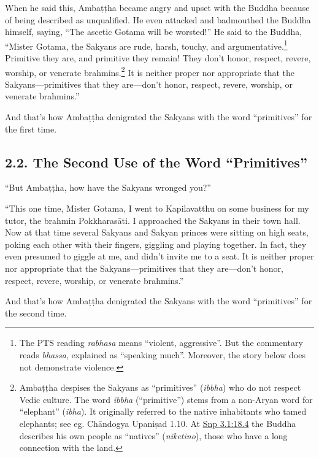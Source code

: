 \documentclass[12pt,openany]{book}%
\begin{document}
When he said this, \textsanskrit{Ambaṭṭha} became angry and upset with the Buddha because of being described as unqualified. He even attacked and badmouthed the Buddha himself, saying, “The ascetic Gotama will be worsted!” He said to the Buddha, “Mister Gotama, the Sakyans are rude, harsh, touchy, and argumentative.\footnote{The PTS reading \textit{rabhasa} means “violent, aggressive”. But the commentary reads \textit{bhassa}, explained as “speaking much”. Moreover, the story below does not demonstrate violence. } Primitive they are, and primitive they remain! They don’t honor, respect, revere, worship, or venerate brahmins.\footnote{\textsanskrit{Ambaṭṭha} despises the Sakyans as “primitives” (\textit{ibbha}) who do not respect Vedic culture. The word \textit{ibbha} (“primitive”) stems from a non-Aryan word for “elephant” (\textit{ibha}). It originally referred to the native inhabitants who tamed elephants; see eg. \textsanskrit{Chāndogya} \textsanskrit{Upaniṣad} 1.10. At \href{https://suttacentral.net/snp3.1/en/sujato\#18.4}{Snp 3.1:18.4} the Buddha describes his own people as “natives” (\textit{niketino}), those who have a long connection with the land. } It is neither proper nor appropriate that the Sakyans—primitives that they are—don’t honor, respect, revere, worship, or venerate brahmins.” 

And that’s how \textsanskrit{Ambaṭṭha} denigrated the Sakyans with the word “primitives” for the first time. 

\subsection*{2.2. The Second Use of the Word “Primitives” }

“But \textsanskrit{Ambaṭṭha}, how have the Sakyans wronged you?” 

“This one time, Mister Gotama, I went to Kapilavatthu on some business for my tutor, the brahmin \textsanskrit{Pokkharasāti}. I approached the Sakyans in their town hall. Now at that time several Sakyans and Sakyan princes were sitting on high seats, poking each other with their fingers, giggling and playing together. In fact, they even presumed to giggle at me, and didn’t invite me to a seat. It is neither proper nor appropriate that the Sakyans—primitives that they are—don’t honor, respect, revere, worship, or venerate brahmins.” 

And that’s how \textsanskrit{Ambaṭṭha} denigrated the Sakyans with the word “primitives” for the second time. 
\end{document}
